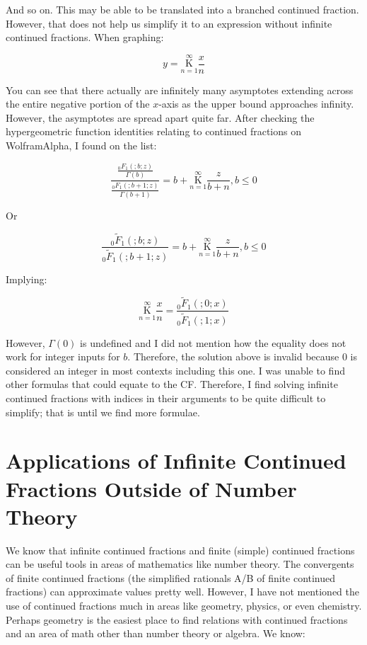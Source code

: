 \documentclass{article}
\begin{document}
And so on. This may be able to be translated into a branched continued fraction. However, that does not help us simplify it to an expression without infinite continued fractions. When graphing:

$$y=\underset{n=1}{\overset{\infty}{\mathrm K}} \frac{x}{n}$$

You can see that there actually are infinitely many asymptotes extending across the entire negative portion of the $x$-axis as the upper bound approaches infinity. However, the asymptotes are spread apart quite far. After checking the hypergeometric function identities relating to continued fractions on WolframAlpha, I found on the list:

$$\frac{\frac{_0 F _1 (;b;z)}{\Gamma(b)}}{\frac{_0 F _1 (;b+1;z)}{\Gamma(b+1)}} = b+\underset{n=1}{\overset{\infty}{\mathrm K}} \frac{z}{b+n}, b \leq 0$$

Or

$$\frac{_0 \tilde {F} _1 (;b;z)}{_0 \tilde {F} _1 (;b+1;z)} = b+\underset{n=1}{\overset{\infty}{\mathrm K}} \frac{z}{b+n}, b \leq 0$$

Implying:

$$\underset{n=1}{\overset{\infty}{\mathrm K}} \frac{x}{n} = \frac{_0 \tilde {F} _1 (;0;x)}{_0 \tilde {F} _1 (;1;x)}$$

However, $\Gamma(0)$ is undefined and I did not mention how the equality does not work for integer inputs for $b$. Therefore, the solution above is invalid because 0 is considered an integer in most contexts including this one. I was unable to find other formulas that could equate to the CF. Therefore, I find solving infinite continued fractions with indices in their arguments to be quite difficult to simplify; that is until we find more formulae.

\section{Applications of Infinite Continued Fractions Outside of Number Theory}

We know that infinite continued fractions and finite (simple) continued fractions can be useful tools in areas of mathematics like number theory. The convergents of finite continued fractions (the simplified rationals A/B of finite continued fractions) can approximate values pretty well. However, I have not mentioned the use of continued fractions much in areas like geometry, physics, or even chemistry. Perhaps geometry is the easiest place to find relations with continued fractions and an area of math other than number theory or algebra. We know:
\end{document}
